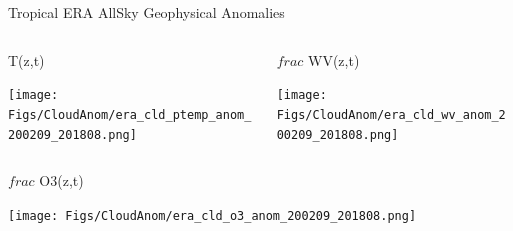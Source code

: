 \documentclass[10pt,t]{beamer}
\begin{document}

\begin{frame}{Tropical ERA AllSky Geophysical Anomalies}
\vspace{-0.35in}

\begin{columns}
\begin{column}{0.45\columnwidth}
\begin{block}{\footnotesize T(z,t)}
\vspace{-0.1in}
\begin{center}
\texttt{[image: Figs/CloudAnom/era\_cld\_ptemp\_anom\_200209\_201808.png]}
\end{center}
\end{block}
\end{column}

\begin{column}{0.45\columnwidth}
\begin{block}{\footnotesize $frac$ WV(z,t)}
\vspace{-0.1in}
\begin{center}
\texttt{[image: Figs/CloudAnom/era\_cld\_wv\_anom\_200209\_201808.png]}
\end{center}
\end{block}
\end{column}
\end{columns}

\vspace{-0.25in}

\begin{columns}
\begin{column}{0.45\columnwidth}
\begin{block}{\footnotesize $frac$ O3(z,t)}
\vspace{-0.1in}
\begin{center}
\texttt{[image: Figs/CloudAnom/era\_cld\_o3\_anom\_200209\_201808.png]}
\end{center}
\end{block}
\end{column}

\begin{column}{0.45\columnwidth}

\end{column}
\end{columns}
\end{frame}
\end{document}
